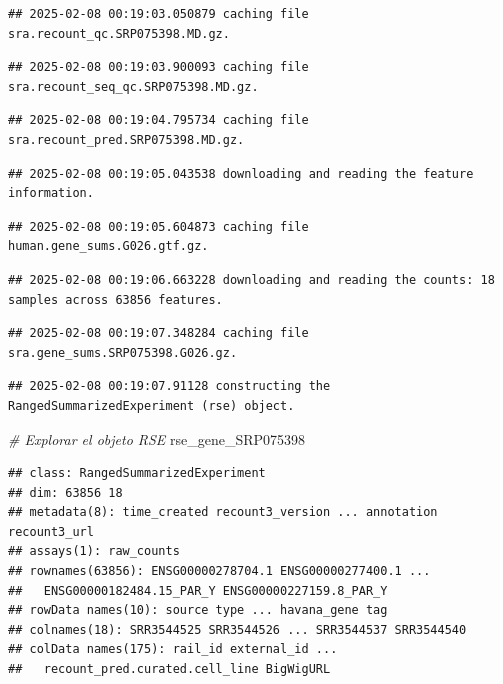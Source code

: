 \documentclass[
]{article}
\newenvironment{Shaded}{\begin{snugshade}}{\end{snugshade}}
\newcommand{\CommentTok}[1]{\textcolor[rgb]{0.56,0.35,0.01}{\textit{#1}}}
\newcommand{\NormalTok}[1]{#1}
\begin{document}
\begin{verbatim}
## 2025-02-08 00:19:03.050879 caching file sra.recount_qc.SRP075398.MD.gz.
\end{verbatim}

\begin{verbatim}
## 2025-02-08 00:19:03.900093 caching file sra.recount_seq_qc.SRP075398.MD.gz.
\end{verbatim}

\begin{verbatim}
## 2025-02-08 00:19:04.795734 caching file sra.recount_pred.SRP075398.MD.gz.
\end{verbatim}

\begin{verbatim}
## 2025-02-08 00:19:05.043538 downloading and reading the feature information.
\end{verbatim}

\begin{verbatim}
## 2025-02-08 00:19:05.604873 caching file human.gene_sums.G026.gtf.gz.
\end{verbatim}

\begin{verbatim}
## 2025-02-08 00:19:06.663228 downloading and reading the counts: 18 samples across 63856 features.
\end{verbatim}

\begin{verbatim}
## 2025-02-08 00:19:07.348284 caching file sra.gene_sums.SRP075398.G026.gz.
\end{verbatim}

\begin{verbatim}
## 2025-02-08 00:19:07.91128 constructing the RangedSummarizedExperiment (rse) object.
\end{verbatim}

\begin{Shaded}
\begin{Highlighting}[]
\CommentTok{\# Explorar el objeto RSE}
\NormalTok{rse\_gene\_SRP075398}
\end{Highlighting}
\end{Shaded}

\begin{verbatim}
## class: RangedSummarizedExperiment 
## dim: 63856 18 
## metadata(8): time_created recount3_version ... annotation recount3_url
## assays(1): raw_counts
## rownames(63856): ENSG00000278704.1 ENSG00000277400.1 ...
##   ENSG00000182484.15_PAR_Y ENSG00000227159.8_PAR_Y
## rowData names(10): source type ... havana_gene tag
## colnames(18): SRR3544525 SRR3544526 ... SRR3544537 SRR3544540
## colData names(175): rail_id external_id ...
##   recount_pred.curated.cell_line BigWigURL
\end{verbatim}
\end{document}
